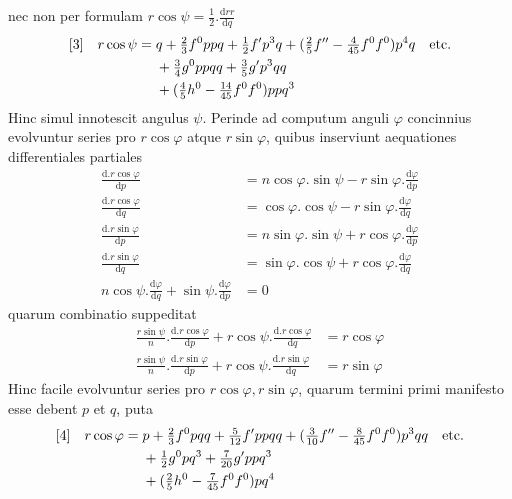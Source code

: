 %
nec non per formulam \(r\cos\psi=\tfrac{1}{2}\mathord{.}\frac{\mathrm{d}rr}{\mathrm{d}q}\)
\[
\begin{aligned}
\relax[3]\quad r\cos\psi={}&q+\tfrac{2}{3}f^0ppq+\tfrac{1}{2}f'p^3q+(\tfrac{2}{5}f''-\tfrac{4}{45}f^0f^0)p^4q\quad\text{etc.}\\
&+\tfrac{3}{4}g^0ppqq+\tfrac{3}{5}g'p^3qq\\
&+(\tfrac{4}{5}h^0-\tfrac{14}{45}f^0f^0)ppq^3
\end{aligned}
\]
Hinc simul innotescit angulus \(\psi\). Perinde ad computum anguli \(\varphi\) concinnius evolvuntur series pro \(r\cos\varphi\) atque \(r\sin\varphi\), quibus inserviunt aequationes differentiales partiales
\[
\begin{aligned}
\frac{\mathrm{d}\mathord{.}r\cos\varphi}{\mathrm{d}p}&=n\cos\varphi\mathord{.}\sin\psi-r\sin\varphi\mathord{.}\frac{\mathrm{d}\varphi}{\mathrm{d}p}\\
\frac{\mathrm{d}\mathord{.}r\cos\varphi}{\mathrm{d}q}&=\cos\varphi\mathord{.}\cos\psi-r\sin\varphi\mathord{.}\frac{\mathrm{d}\varphi}{\mathrm{d}q}\\
\frac{\mathrm{d}\mathord{.}r\sin\varphi}{\mathrm{d}p}&=n\sin\varphi\mathord{.}\sin\psi+r\cos\varphi\mathord{.}\frac{\mathrm{d}\varphi}{\mathrm{d}p}\\
\frac{\mathrm{d}\mathord{.}r\sin\varphi}{\mathrm{d}q}&=\sin\varphi\mathord{.}\cos\psi+r\cos\varphi\mathord{.}\frac{\mathrm{d}\varphi}{\mathrm{d}q}\\
n\cos\psi\mathord{.}\frac{\mathrm{d}\varphi}{\mathrm{d}q}+\sin\psi\mathord{.}\frac{\mathrm{d}\varphi}{\mathrm{d}p}&=0
\end{aligned}
\]
quarum combinatio suppeditat
\[
\begin{aligned}
\frac{r\sin\psi}{n}\mathord{.}\frac{\mathrm{d}\mathord{.}r\cos\varphi}{\mathrm{d}p}+r\cos\psi\mathord{.}\frac{\mathrm{d}\mathord{.}r\cos\varphi}{\mathrm{d}q}&=r\cos\varphi\\
\frac{r\sin\psi}{n}\mathord{.}\frac{\mathrm{d}\mathord{.}r\sin\varphi}{\mathrm{d}p}+r\cos\psi\mathord{.}\frac{\mathrm{d}\mathord{.}r\sin\varphi}{\mathrm{d}q}&=r\sin\varphi
\end{aligned}
\]
Hinc facile evolvuntur series pro \(r\cos\varphi,r\sin\varphi\), quarum termini primi manifesto esse debent \(p\) et \(q\), puta
\[
\begin{aligned}
\relax[4]\quad r\cos\varphi={}&p+\tfrac{2}{3}f^0pqq+\tfrac{5}{12}f'ppqq+(\tfrac{3}{10}f''-\tfrac{8}{45}f^0f^0)p^3qq\quad\text{etc.}\\
&+\tfrac{1}{2}g^0pq^3+\tfrac{7}{20}g'ppq^3\\
&+(\tfrac{2}{5}h^0-\tfrac{7}{45}f^0f^0)pq^4
\end{aligned}
\]
